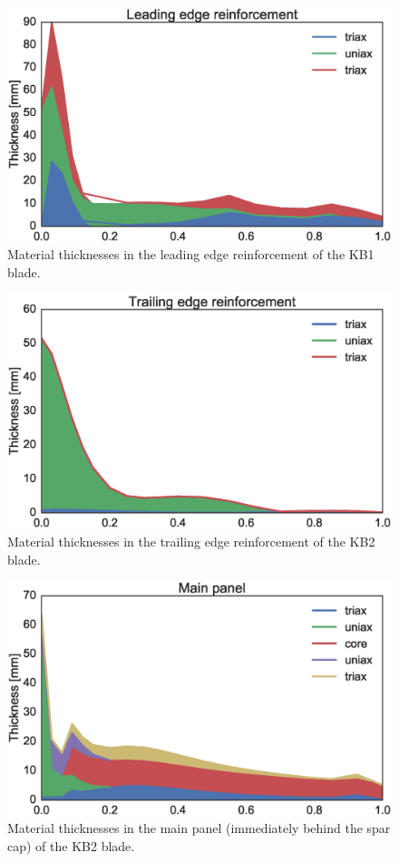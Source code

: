 \begin{figure}[!ht]
\begin{center}
	\includegraphics[width=.85\linewidth]{figures/KB1_region07.eps}
\end{center}
\caption{Material thicknesses in the leading edge reinforcement of the KB1 blade.}
\label{fig:matstackr07}
\end{figure}

\begin{figure}[!ht]
\begin{center}
	\includegraphics[width=.85\linewidth]{figures/KB2_region01.eps}
\end{center}
\caption{Material thicknesses in the trailing edge reinforcement of the KB2 blade.}
\label{fig:matstackr01}
\end{figure}

\begin{figure}[!ht]
\begin{center}
	\includegraphics[width=.85\linewidth]{figures/KB2_region02.eps}
\end{center}
\caption{Material thicknesses in the main panel (immediately behind the spar cap) of the KB2 blade.}
\label{fig:matstackr02}
\end{figure}

